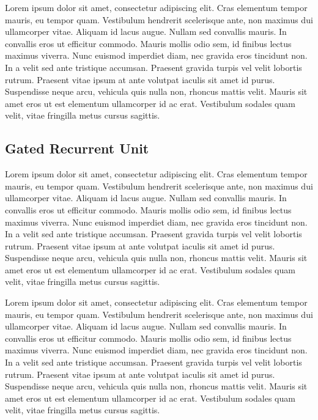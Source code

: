 \documentclass[conference]{IEEEtran}
\begin{document}
Lorem ipsum dolor sit amet, consectetur adipiscing elit. Cras elementum tempor mauris, eu tempor quam. Vestibulum hendrerit scelerisque ante, non maximus dui ullamcorper vitae. Aliquam id lacus augue. Nullam sed convallis mauris. In convallis eros ut efficitur commodo. Mauris mollis odio sem, id finibus lectus maximus viverra. Nunc euismod imperdiet diam, nec gravida eros tincidunt non. In a velit sed ante tristique accumsan. Praesent gravida turpis vel velit lobortis rutrum. Praesent vitae ipsum at ante volutpat iaculis sit amet id purus. Suspendisse neque arcu, vehicula quis nulla non, rhoncus mattis velit. Mauris sit amet eros ut est elementum ullamcorper id ac erat. Vestibulum sodales quam velit, vitae fringilla metus cursus sagittis.

\subsection{Gated Recurrent Unit}

Lorem ipsum dolor sit amet, consectetur adipiscing elit. Cras elementum tempor mauris, eu tempor quam. Vestibulum hendrerit scelerisque ante, non maximus dui ullamcorper vitae. Aliquam id lacus augue. Nullam sed convallis mauris. In convallis eros ut efficitur commodo. Mauris mollis odio sem, id finibus lectus maximus viverra. Nunc euismod imperdiet diam, nec gravida eros tincidunt non. In a velit sed ante tristique accumsan. Praesent gravida turpis vel velit lobortis rutrum. Praesent vitae ipsum at ante volutpat iaculis sit amet id purus. Suspendisse neque arcu, vehicula quis nulla non, rhoncus mattis velit. Mauris sit amet eros ut est elementum ullamcorper id ac erat. Vestibulum sodales quam velit, vitae fringilla metus cursus sagittis.

Lorem ipsum dolor sit amet, consectetur adipiscing elit. Cras elementum tempor mauris, eu tempor quam. Vestibulum hendrerit scelerisque ante, non maximus dui ullamcorper vitae. Aliquam id lacus augue. Nullam sed convallis mauris. In convallis eros ut efficitur commodo. Mauris mollis odio sem, id finibus lectus maximus viverra. Nunc euismod imperdiet diam, nec gravida eros tincidunt non. In a velit sed ante tristique accumsan. Praesent gravida turpis vel velit lobortis rutrum. Praesent vitae ipsum at ante volutpat iaculis sit amet id purus. Suspendisse neque arcu, vehicula quis nulla non, rhoncus mattis velit. Mauris sit amet eros ut est elementum ullamcorper id ac erat. Vestibulum sodales quam velit, vitae fringilla metus cursus sagittis.
\end{document}
